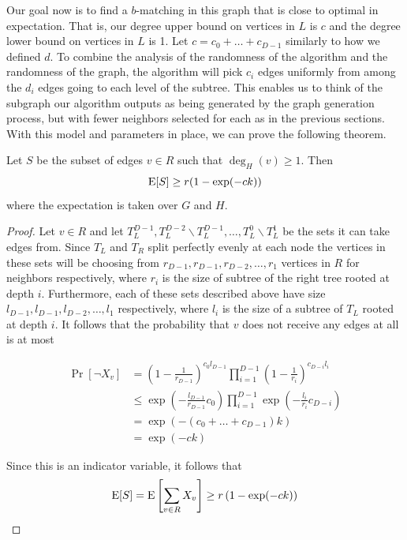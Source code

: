 Our goal now is to find a $b$-matching in this graph that is close to
optimal in expectation. That is, our degree upper bound on vertices in
$L$ is $c$ and the degree lower bound on vertices in $L$ is 1. Let $c
= c_0 + \ldots + c_{D-1}$ similarly to how we defined $d$. 
To combine the analysis of the randomness of the algorithm
and the randomness of the graph, the algorithm will pick $c_{i}$ edges
uniformly from among the $d_{i}$ edges going to each level of the
subtree. This enables us to think of the subgraph our algorithm
outputs as being generated by the graph generation process, but with
fewer neighbors selected for each as in the previous sections. With
this model and parameters in place, we can prove the following
theorem.\

\begin{thm}
Let $S$ be the subset of edges $v\in R$ such that $\deg_H(v) \geq 1$. Then
\[ \text{E}[S] \geq r(1-\exp(-ck)) \]
where the expectation is taken over $G$ and $H$.
\end{thm}

\begin{proof}
Let $v\in R$ and let $T_L^{D-1}, T_L^{D-2}\backslash T_L^{D-1},
\ldots, T_L^0\backslash T_L^1$ be the sets it can take edges
from. Since $T_L$ and $T_R$ split perfectly evenly at each node the
vertices in these sets will be choosing from $r_{D-1}, r_{D-1},
r_{D-2},\ldots, r_{1}$ vertices in $R$ for neighbors respectively,
where $r_i$ is the size of subtree of the right tree rooted at depth
$i$. Furthermore, each of these sets described above have size
$l_{D-1}, l_{D-1}, l_{D-2}, \ldots, l_{1}$ respectively, where $l_i$
is the size of a subtree of $T_L$ rooted at depth $i$. It follows that
the probability that $v$ does not receive any edges at all is at most

\begin{align*}
	      \Pr[\lnot X_v] 
	&=    \left(1-\frac{1}{r_{D-1}}\right)^{c_0l_{D-1}}\prod_{i=1}^{D-1}\left(1 - \frac{1}{r_i}\right)^{c_{D-i} l_i} \\
	&\leq \exp\left(-\frac{l_{D-1}}{r_{D-1}}c_0\right)\prod_{i=1}^{D-1} \exp\left(-\frac{l_i}{r_i}c_{D-i}\right) \\
	&=    \exp\left(-(c_0 + \ldots + c_{D-1})k\right) \\
	&=    \exp(-ck)
\end{align*}

Since this is an indicator variable, it follows that 
\[ \text{E}[S] = \text{E}\left[\sum_{v \in R} X_v \right] \geq r \left(1-\exp(-ck)\right) \]
\end{proof}


